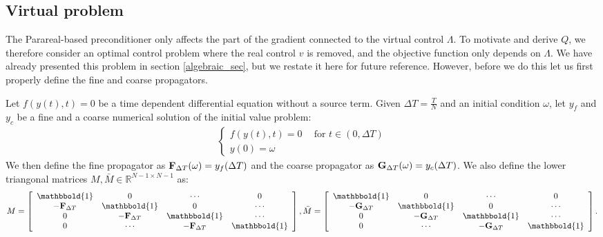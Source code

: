 \subsection{Virtual problem} \label{vir_sec}
The Parareal-based preconditioner only affects the part of the gradient connected to the virtual control $\Lambda$. To motivate and derive $Q$, we therefore consider an optimal control problem where the real control $v$ is removed, and the objective function only depends on $\Lambda$. We have already presented this problem in section \ref{algebraic_sec}, but we restate it here for future reference. However, before we do this let us first properly define the fine and coarse propagators.
\begin{definition} \label{prop_def}
Let $f(y(t),t)=0$ be a time dependent differential equation without a source term. Given $\Delta T=\frac{T}{N}$ and an initial condition $\omega$, let $y_f$ and $y_c$ be a fine and a coarse numerical solution of the initial value problem:
\begin{align}
 \left\{
     \begin{array}{lr}
		f(y(t),t)=0 \ \quad \textrm{for $t \in (0,\Delta T)$} \\
		y(0)=\omega
	\end{array}
	\right.	
\end{align}
We then define the fine propagator as $\bold F_{\Delta T}(\omega) = y_f(\Delta T)$ and the coarse propagator as $\bold G_{\Delta T}(\omega) = y_c(\Delta T)$. We also define the lower triangonal matrices $M,\bar M\in\mathbb{R}^{N-1\times N-1}$ as: 
\begin{align*}
M= \left[ \begin{array}{cccc}
   \mathbbold{1} & 0 & \cdots & 0 \\  
   -\bold{F}_{\Delta T} & \mathbbold{1} & 0 & \cdots \\ 
   0 &-\bold{F}_{\Delta T} & \mathbbold{1}  & \cdots \\
   0 &\cdots &-\bold{F}_{\Delta T} & \mathbbold{1}  \\
   \end{array}  \right],
\bar M= \left[ \begin{array}{cccc}
   \mathbbold{1} & 0 & \cdots & 0 \\  
   -\bold{G}_{\Delta T} & \mathbbold{1} & 0 & \cdots \\ 
   0 &-\bold{G}_{\Delta T} & \mathbbold{1}  & \cdots \\
   0 &\cdots &-\bold{G}_{\Delta T} & \mathbbold{1}   \\
   \end{array}  \right].
\end{align*}
\end{definition}
